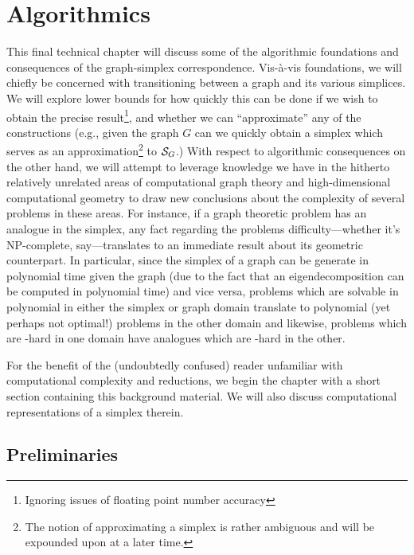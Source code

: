 \chapter{Algorithmics}
\label{chap:algorithmics}

This final technical chapter will discuss some of the algorithmic foundations and consequences of the graph-simplex correspondence. Vis-\`{a}-vis foundations, we will chiefly be concerned with transitioning between a graph and its various simplices. We will explore lower bounds for how quickly this can be done if we wish to obtain the precise result\footnote{Ignoring issues of floating point number accuracy}, and whether we can ``approximate'' any of the constructions (e.g., given the graph $G$ can we quickly obtain a simplex which serves as an approximation\footnote{The notion of approximating a simplex is rather ambiguous and will be expounded upon at a later time.} to $\mathcal{S}_G$.) With respect to algorithmic consequences on the other hand, we will attempt to leverage knowledge we have in the hitherto relatively unrelated areas of computational graph theory and high-dimensional computational geometry to draw new conclusions about the complexity of several problems in these areas. For instance, if a  graph theoretic problem has an analogue in the simplex, any fact regarding the problems difficulty---whether it's NP-complete, say---translates to an immediate result about its geometric counterpart. In particular, since the simplex of a graph can be generate in polynomial time given the graph (due to the fact that an eigendecomposition can be computed in polynomial time) and vice versa, problems which are solvable in polynomial in either the simplex or graph domain  translate to polynomial (yet perhaps not optimal!) problems in the other domain and likewise, problems which are \NP-hard in one domain have analogues which are \NP-hard in the other. 

For the benefit of the (undoubtedly confused) reader unfamiliar with computational complexity and reductions, we begin the chapter with a short section containing this background material. We will also discuss computational representations of a simplex therein. 

\section{Preliminaries}
\label{sec:algorithmics_prelims}
